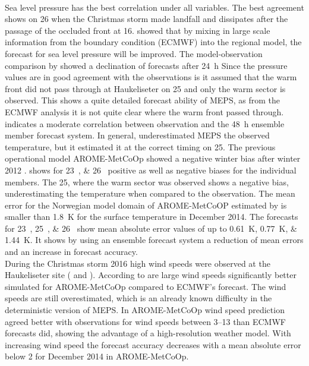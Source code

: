 \\
Sea level pressure has the best correlation under all variables. The best agreement shows on \SI{26}{\dec} when the Christmas storm made landfall and dissipates after the passage of the occluded front at \SI{16}{\UTC}. \citet{dahlgren_comparison_2013} showed that by mixing in large scale information from the boundary condition (ECMWF) into the regional model, the forecast for sea level pressure will be improved. The model-observation comparison by \citet{dahlgren_comparison_2013} showed a declination of forecasts after \SI{24}{\hour} 
Since the pressure values are in good agreement with the observations is it assumed that the warm front did not pass through at Haukeliseter on \SI{25}{\dec} and only the warm sector is observed. This shows a quite detailed forecast ability of MEPS, as from the ECMWF analysis it is not quite clear where the warm front passed through. 
\\
 indicates a moderate correlation between observation and the \SI{48}{\hour} ensemble member forecast system. In general, underestimated MEPS the observed temperature, but it estimated it at the correct timing on \SI{25}{\dec}. The previous operational model AROME-MetCoOp showed a negative winter bias after winter 2012 \citep{muller_arome-metcoop:_2017}.  shows for \SIlist{23;26}{\dec} positive as well as negative biases for the individual members. The \SI{25}{\dec}, where the warm sector was observed shows a negative bias, underestimating the temperature when compared to the observation. The mean error for the Norwegian model domain of AROME-MetCoOP estimated by \citet{muller_arome-metcoop:_2017} is smaller than \SI{1.8}{\kelvin} for the surface temperature in December 2014. The forecasts for \SIlist{23;25;26}{\dec} show mean absolute error values of up to \SIlist{0.61;0.77;1.44}{\kelvin}. It shows by using an ensemble forecast system a reduction of mean errors and an increase in forecast accuracy. 
\\
During the Christmas storm 2016 high wind speeds were observed at the Haukeliseter site ( and ).
According to \citet{muller_arome-metcoop:_2017} are large wind speeds significantly better simulated for AROME-MetCoOp compared to ECMWF's forecast. The wind speeds are still overestimated, which is an already known difficulty in the deterministic version of MEPS. In AROME-MetCoOp wind speed prediction agreed better with observations for wind speeds between \SIrange{3}{13}{\mPs} than ECMWF forecasts did, showing the advantage of a high-resolution weather model. With increasing wind speed the forecast accuracy decreases with a mean absolute error below \SI{2}{\mPs} for December 2014 in AROME-MetCoOp.
